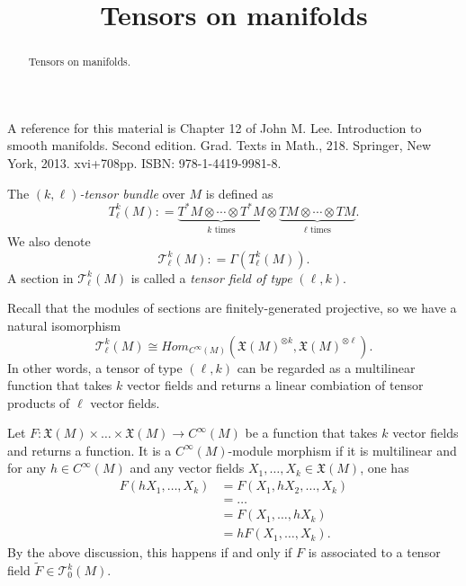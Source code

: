 \documentclass{ximera}
\title{Tensors on manifolds}
\begin{document}
    \begin{abstract}  Tensors on manifolds.   \end{abstract}
    \maketitle

 A reference for this material is Chapter 12  of John M. Lee. Introduction to smooth manifolds. Second edition. Grad. Texts in Math., 218. Springer, New York, 2013. xvi+708pp. ISBN: 978-1-4419-9981-8. 


\begin{definition}
    The $(k,\ell)$\emph{-tensor bundle} over $M$ is defined as
    \[    T ^{k}_{\ell} (M) : = \underbrace{ T^{\ast}M \otimes \cdots \otimes T^{\ast}M }_{k  \text{ times}} \otimes  \underbrace{ TM \otimes \cdots \otimes TM }_{\ell \text{ times}} .   
    \]
    We also denote
    \[   \mathcal{T}^k_{\ell} (M) : = \Gamma ( T ^k_{\ell} (M) ).                 \]
    A section in $\mathcal{T}^k_{\ell} (M)$ is called a \emph{tensor field of type} $(\ell ,  k )$. 
\end{definition}
Recall that the modules of sections are finitely-generated projective, so we have a natural isomorphism
\[   \mathcal{T}^k_{\ell} (M) \cong Hom_{C^{\infty}(M)}  (  \mathfrak{X} (M ) ^{\otimes k} , \mathfrak{X} (M) ^{ \otimes  \ell}   )   .                 \]
In other words, a tensor of type $(\ell, k)$ can be regarded as a multilinear function that takes $k$ vector fields and returns a linear combiation of tensor products of $\ell$ vector fields. 

\begin{example}
    Let $ F : \mathfrak{X} (M) \times \ldots \times \mathfrak{X} (M)  \to C^{\infty} (M) $ be a function that takes $k$ vector fields and returns a function.  It is a $C^{\infty}(M)$-module morphism if it is multilinear and for any $h \in C^{\infty } (M) $ and any vector fields $X_1, \ldots , X_k \in \mathfrak{X}(M)$, one has
    \begin{align*}
     F  (h X _1,   \ldots , X_k) & = F(X_1, hX_2, \ldots , X_k) \\
     & = \ldots  \\
     & = F(X_1, \ldots , hX_k ) \\
      & = h F (X_1, \ldots , X_k) .   
    \end{align*}
    By the above discussion, this happens if and only if $F$ is associated to a tensor field $\tilde{F} \in \mathcal{T}^k_0(M)$. 
\end{example}
\end{document}
